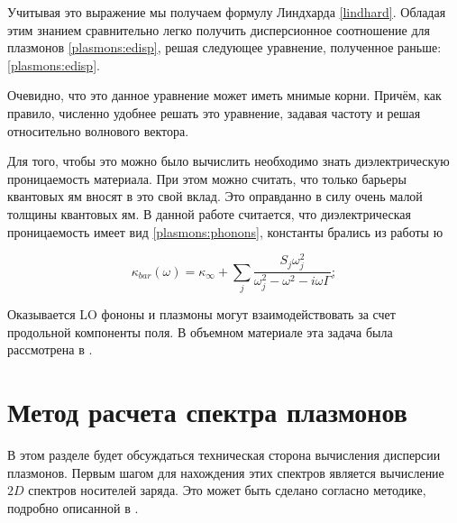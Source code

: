 \documentclass[../main.tex]{subfiles}
\begin{document}
    Учитывая это выражение мы получаем формулу Линдхарда \ref{lindhard}. Обладая 
    этим знанием сравнительно легко получить дисперсионное соотношение для плазмонов
    \ref{plasmons:edisp}, решая следующее уравнение, полученное раньше: \ref{plasmons:edisp}.

    
    Очевидно, что это данное уравнение может иметь мнимые корни. Причём, как правило,
    численно удобнее решать это уравнение, задавая частоту и решая относительно 
    волнового вектора.



    Для того, чтобы это можно было вычислить необходимо знать диэлектрическую 
    проницаемость материала. При этом можно считать, что только барьеры 
    квантовых ям вносят в это свой вклад. Это оправданно в силу очень малой
    толщины квантовых ям. В данной работе считается, что диэлектрическая 
    проницаемость имеет вид \ref{plasmons:phonons}, константы брались
    из работы \cite{palik1998handbook}ю

    \begin{equation}
        \label{plasmons:phonons}
        \kappa_{bar}(\omega) = \kappa_\infty + \sum_{j} \frac{S_j \omega_j^2}
                                    {\omega_j^2 - \omega^2 - i \omega \Gamma};
    \end{equation}

    Оказывается LO фононы и плазмоны могут взаимодействовать за счет продольной компоненты поля.
    В объемном материале эта задача была рассмотрена в \cite{peter2002manuel}. 

    \section{Метод расчета спектра плазмонов \label{comp:section}}


    В этом разделе будет обсуждаться техническая сторона вычисления дисперсии плазмонов.
    Первым шагом для нахождения этих спектров является вычисление $2D$ спектров носителей заряда. 
    Это может быть сделано согласно методике, подробно описанной в \cite{HgCdTeCalcZholudev}.
    
\end{document}
